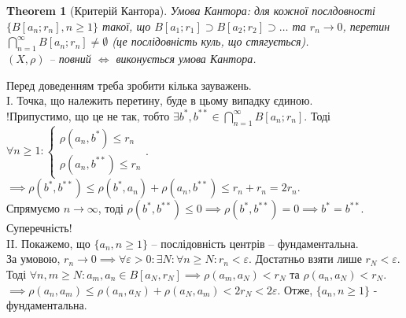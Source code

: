 \documentclass[a4paper, 10pt]{article}
\theoremstyle{theoremdd}
\newtheorem{theorem}{Theorem}[subsection]
\theoremstyle{theoremdd}
\theoremstyle{theoremdd}
\theoremstyle{theoremdd}
\theoremstyle{theoremdd}
\theoremstyle{theoremdd}
\theoremstyle{theoremdd}
\theoremstyle{theoremdd}
\begin{document}
\begin{theorem}[Критерій Кантора]
Умова Кантора: для кожної послдовності $\{B[a_n;r_n], n \geq 1\}$ такої, що $B[a_1;r_1] \supset B[a_2;r_2] \supset \dots$ та $r_n \to 0$, перетин $\displaystyle\bigcap_{n=1}^\infty B[a_n;r_n] \neq \emptyset$ (це послідовність куль, що стягується).\\
$(X,\rho)$ -- повний $\iff$ виконується умова Кантора.
\end{theorem}

Перед доведенням треба зробити кілька зауважень.\\
I. Точка, що належить перетину, буде в цьому випадку єдиною.\\
!Припустимо, що це не так, тобто $\exists b^*, b^{**} \in \displaystyle \bigcap_{n=1}^\infty B[a_n;r_n]$. Тоді $\forall n \geq 1: \begin{cases} \rho(a_n, b^*) \leq r_n \\ \rho(a_n, b^{**}) \leq r_n \end{cases}$.\\
$\implies \rho(b^*, b^{**}) \leq \rho(b^*,a_n) + \rho(a_n, b^{**}) \leq r_n + r_n = 2r_n$.\\
Спрямуємо $n \to \infty$, тоді $\rho(b^*,b^{**}) \leq 0 \implies \rho(b^*,b^{**}) = 0 \implies b^{*} = b^{**}$. Суперечність!
\bigskip \\
II. Покажемо, що $\{a_n, n \geq 1\}$ -- послідовність центрів -- фундаментальна.\\
За умовою, $r_n \to 0 \implies \forall \varepsilon > 0: \exists N: \forall n \geq N: r_n < \varepsilon$. Достатньо взяти лише $r_N < \varepsilon$. Тоді $\forall n,m \geq N: a_m,a_n \in B[a_N,r_N] \implies \rho(a_m,a_N) < r_N$ та $\rho(a_n,a_N) < r_N$.\\
$\implies \rho(a_n,a_m) \leq \rho(a_n,a_N) + \rho(a_N,a_m) < 2r_N < 2 \varepsilon$. Отже, $\{a_n, n \geq 1\}$ - фундаментальна.
\end{document}
